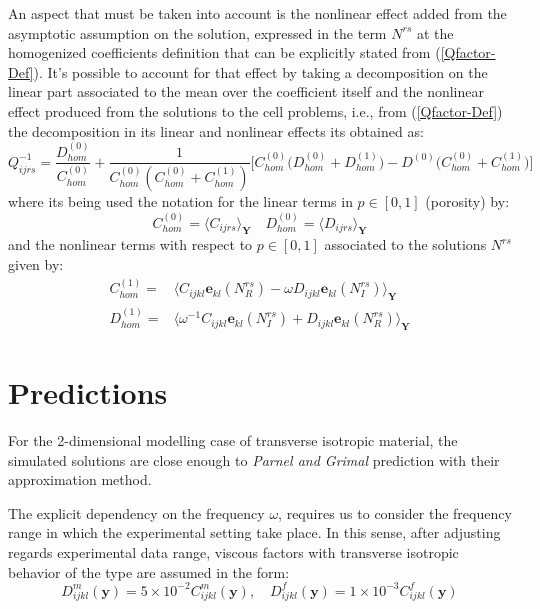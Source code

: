 An aspect that must be taken into account is the nonlinear effect added from the asymptotic assumption on the solution, expressed in the term $N^{rs}$ at the homogenized coefficients definition that can be explicitly stated from (\ref{Qfactor-Def}).
It's possible to account for that effect by taking a decomposition on the linear part associated to the mean over the coefficient itself and the nonlinear effect produced from the solutions to the cell problems, i.e., from (\ref{Qfactor-Def}) the decomposition in its linear and nonlinear effects its obtained as:
\begin{equation}
    \label{Expansion-Qfactor}
        Q_{ijrs}^{-1} =  \frac{D_{hom}^{(0)}}{C_{hom}^{(0)}} + \frac{1}{C^{(0)}_{hom}\left( C^{(0)}_{hom} + C^{(1)}_{hom} \right)} \big[C^{(0)}_{hom} \big( D^{(0)}_{hom} + D^{(1)}_{hom}\big) - D^{(0)}\big( C^{(0)}_{hom} + C^{(1)}_{hom} \big) \big]
\end{equation}
where its being used the notation for the linear terms in $p \in [0,1]$ (porosity) by:
\begin{equation*}
    C^{(0)}_{hom} = \langle C_{ijrs} \rangle_{\mathbf{Y}} \quad  D^{(0)}_{hom} = \langle D_{ijrs} \rangle_{\mathbf{Y}}
\end{equation*}
and the nonlinear terms with respect to $p \in [0,1]$ associated to the solutions $N^{rs}$ given by:
\begin{equation*}
    \begin{array}{cc}
        C^{(1)}_{hom} =& \langle C_{ijkl}\mathbf{e}_{kl}(N^{rs}_R) - \omega D_{ijkl}\mathbf{e}_{kl}(N^{rs}_I) \rangle_{\mathbf{Y}} \\
        D^{(1)}_{hom} =& \langle \omega^{-1} C_{ijkl}\mathbf{e}_{kl}(N^{rs}_I) + D_{ijkl}\mathbf{e}_{kl}(N^{rs}_R) \rangle_{\mathbf{Y}} 
    \end{array}
\end{equation*}




\section{Predictions}
\begin{rem}
For the 2-dimensional modelling case of transverse isotropic material, the simulated solutions are close enough to \textit{Parnel and Grimal} prediction with their approximation method.
\end{rem}

The explicit dependency on the frequency $\omega$, requires us to consider the frequency range in which the experimental setting take place. In this sense, after adjusting regards experimental data range, viscous factors with transverse isotropic behavior of the type are assumed in the form:
\begin{equation*}
    D^m_{ijkl} (\mathbf{y}) = 5\times10^{-2} C^{m}_{ijkl}(\mathbf{y}), \quad D^f_{ijkl}(\mathbf{y}) = 1 \times 10^{-3} C^{f}_{ijkl}(\mathbf{y})
\end{equation*}

